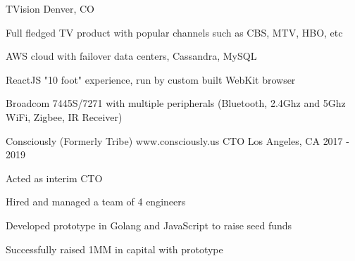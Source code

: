 \begin{cventries}
  \cventry
    {TVision}
    {Denver, CO}
    {
      \begin{cvitems}
        \item {Full fledged TV product with popular channels such as CBS, MTV, HBO, etc}
        \item {AWS cloud with failover data centers, Cassandra, MySQL}
        \item {ReactJS "10 foot" experience, run by custom built WebKit browser}
        \item {Broadcom 7445S/7271 with multiple peripherals (Bluetooth, 2.4Ghz and 5Ghz WiFi, Zigbee, IR Receiver)}
      \end{cvitems}
    }

  \cventry
    {Consciously (Formerly Tribe) www.consciously.us}
    {CTO}
    {Los Angeles, CA}
    {2017 - 2019}
    {
      \begin{cvitems}
        \item {Acted as interim CTO}
        \item {Hired and managed a team of 4 engineers}
        \item {Developed prototype in Golang and JavaScript to raise seed funds}
        \item {Successfully raised 1MM in capital with prototype}
      \end{cvitems}
    }
\end{cventries}
